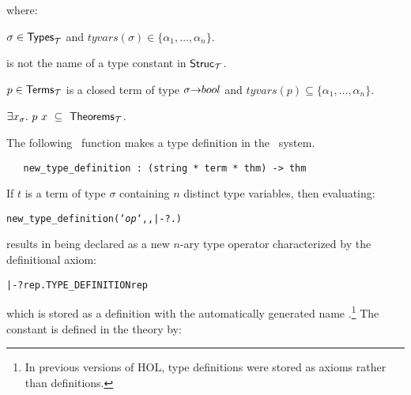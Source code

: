 \noindent where:

\begin{myenumerate}
\item $\sigma\in{\sf Types}_{\cal T}$  and
$tyvars(\sigma)\in\{\alpha_1, \ldots , \alpha_n\}$.
\item {} is not the name of a type constant in ${\sf Struc}_{\cal T}$.
\item $p\in{\sf Terms}_{\cal T}$ is a closed term of
type $\sigma{\to}{\sl bool}$  and
$tyvars(p)\subseteq\{\alpha_1, \ldots , \alpha_n\}$.
\item $\exists x_{\sigma}.\ p\ x \ \subseteq\ {\sf Theorems}_{\cal T}$.
\end{myenumerate}

The following \ML\ function makes a type definition in the \HOL\ system.

\begin{boxed}
\begin{verbatim}
   new_type_definition : (string * term * thm) -> thm
\end{verbatim}\end{boxed}

\noindent If $t$ is a term of type
$\sigma$ containing $n$ distinct type variables, then
evaluating:

{\def\op{{\normalsize\sl op}}
\begin{hol}\begin{alltt}
   new_type_definition(`{\op}`, , |- ?.)
\end{alltt}\end{hol}}

\noindent results in  being declared as a new $n$-ary type operator
characterized by the definitional axiom:

\begin{hol}\begin{alltt}
   |- ?rep. TYPE\_DEFINITION  rep
\end{alltt}\end{hol}

\noindent which is stored as a definition with the automatically
generated name
.\footnote{In
previous versions of HOL, type definitions
were stored as axioms rather than definitions.} The constant
is defined in the theory  by:

